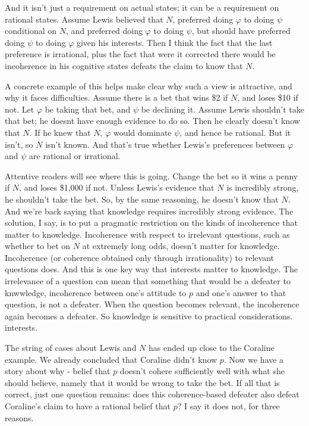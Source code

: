 \documentclass[11pt,]{book}
\begin{document}
And it isn't just a requirement on actual states; it can be a requirement on rational states. Assume Lewis believed that \(N\), preferred doing \(\varphi\) to doing \(\psi\) conditional on \(N\), and preferred doing \(\varphi\) to doing \(\psi\), but should have preferred doing \(\psi\) to doing \(\varphi\) given his interests. Then I think the fact that the last preference is irrational, plus the fact that were it
corrected there would be incoherence in his cognitive states defeats the claim to know that \(N\).

A concrete example of this helps make clear why such a view is attractive, and why it faces difficulties. Assume there is a bet that wins \$2 if \(N\), and loses \$10 if not. Let \(\varphi\) be taking that bet, and \(\psi\) be declining it. Assume Lewis shouldn't take that bet; he doesnt have enough evidence to do so. Then he clearly doesn't know that \(N\). If he knew that \(N\), \(\varphi\) would dominate \(\psi\), and
hence be rational. But it isn't, so \(N\) isn't known. And that's true whether Lewis's preferences between \(\varphi\) and \(\psi\) are rational or irrational.

Attentive readers will see where this is going. Change the bet so it wins a penny if \(N\), and loses \$1,000 if not. Unless Lewis's evidence that \(N\) is incredibly strong, he shouldn't take the bet. So, by the same reasoning, he doesn't know that \(N\). And we're back saying that knowledge requires incredibly strong evidence. The solution, I say, is to put a pragmatic restriction on the kinds of incoherence that matter to knowledge. Incoherence with respect to irrelevant questions, such as whether to bet on \(N\) at extremely long odds, doesn't matter for
knowledge. Incoherence (or coherence obtained only through irrationality) to relevant questions does. And this is one key way that interests matter to knowledge. The irrelevance of a question can mean that something that would be a defeater to knwwledge, incoherence between one's attitude to \(p\) and one's answer to that question, is not a defeater. When the question becomes relevant, the incoherence again becomes a defeater. So knowledge is sensitive to practical considerations.
interests.

The string of cases about Lewis and \(N\) has ended up close to the Coraline example. We already concluded that Coraline didn't know \(p\). Now we have a story about why - belief that \(p\) doesn't cohere
sufficiently well with what she should believe, namely that it would be wrong to take the bet. If all that is correct, just one question
remains: does this coherence-based defeater also defeat Coraline's claim to have a rational belief that \(p\)? I say it does not, for three reasons.
\end{document}
